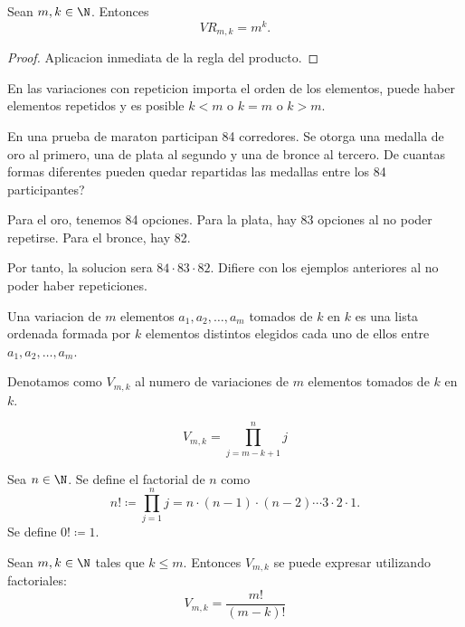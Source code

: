 \vspace{2cm}
\begin{theorem}
	Sean \(m,k \in \N \). Entonces
	\[
		VR_{m,k} = m^{k}.
	\]
\end{theorem}
\begin{proof}
	Aplicacion inmediata de la regla del producto.
\end{proof}

En las variaciones con repeticion importa el orden de los elementos, puede haber elementos repetidos y es posible \(k < m \) o \(k = m \) o \(k > m \).

\begin{example}
	En una prueba de maraton participan 84 corredores. Se otorga una medalla de oro al primero, una de plata al segundo y una de bronce al tercero. De cuantas formas diferentes pueden quedar repartidas las medallas entre los 84 participantes?

	Para el oro, tenemos 84 opciones. Para la plata, hay 83 opciones al no poder repetirse. Para el bronce, hay 82.

	Por tanto, la solucion sera \(84 \cdot 83 \cdot 82 \). Difiere con los ejemplos anteriores al no poder haber repeticiones.
\end{example}

\begin{definition}
	Una variacion de \(m \) elementos \(a_1,a_{2}, \ldots, a_m \) tomados de \(k \) en \(k \) es una lista ordenada formada por \(k \) elementos distintos elegidos cada uno de ellos entre \(a_1,a_2,\ldots,a_m \).

	Denotamos como \(V_{m,k} \) al numero de variaciones de \(m \) elementos tomados de \(k \) en \(k \).

	\[
		V_{m,k} = \prod\limits_{j=m-k+1}^{n } j
	\]
\end{definition}

\begin{definition}
	Sea \(n \in \N \). Se define el factorial de \(n \) como
	\[
		n! \coloneqq \prod\limits_{j=1}^{n } j = n \cdot (n-1) \cdot (n-2) \cdots 3 \cdot 2 \cdot 1.
	\]
	Se define \(0! \coloneqq 1 \).
\end{definition}

\vspace{2cm}
\begin{theorem}
	Sean \(m,k\in  \N\) tales que \(k \leq m \). Entonces
	\(V_{m,k}\) se puede expresar utilizando factoriales:
	\[
		V_{m,k} = \frac{m!}{(m-k)!}
	\]
\end{theorem}

